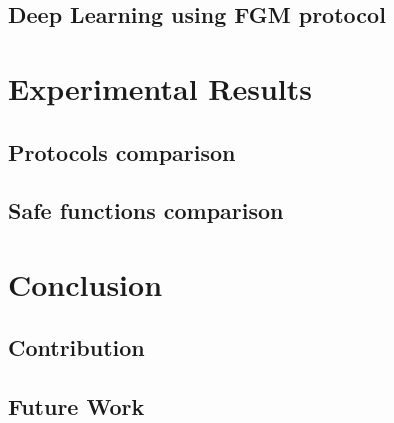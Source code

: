 \documentclass{beamer}
\begin{document}
    \subsection{Deep Learning using FGM protocol}\label{subsec:deep-learning-using-fgm-protocol}




    \section{Experimental Results}\label{sec:experimental-results}

    \subsection{Protocols comparison}\label{subsec:protocols-comparison}

    \subsection{Safe functions comparison}\label{subsec:safe-functions-comparison}




    \section{Conclusion}\label{sec:conclusion}

    \subsection{Contribution}\label{subsec:contribution}

    \subsection{Future Work}\label{subsec:future-work}
\end{document}
